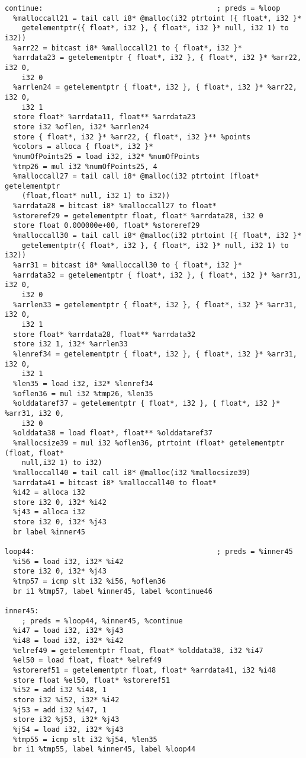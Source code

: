 \documentclass[main.tex]{subfiles}
\begin{document}
{\begin{lstlisting}
continue:                                         ; preds = %loop
  %malloccall21 = tail call i8* @malloc(i32 ptrtoint ({ float*, i32 }* 
    getelementptr({ float*, i32 }, { float*, i32 }* null, i32 1) to i32))
  %arr22 = bitcast i8* %malloccall21 to { float*, i32 }*
  %arrdata23 = getelementptr { float*, i32 }, { float*, i32 }* %arr22, i32 0,
    i32 0
  %arrlen24 = getelementptr { float*, i32 }, { float*, i32 }* %arr22, i32 0, 
    i32 1
  store float* %arrdata11, float** %arrdata23
  store i32 %oflen, i32* %arrlen24
  store { float*, i32 }* %arr22, { float*, i32 }** %points
  %colors = alloca { float*, i32 }*
  %numOfPoints25 = load i32, i32* %numOfPoints
  %tmp26 = mul i32 %numOfPoints25, 4
  %malloccall27 = tail call i8* @malloc(i32 ptrtoint (float* getelementptr 
    (float,float* null, i32 1) to i32))
  %arrdata28 = bitcast i8* %malloccall27 to float*
  %storeref29 = getelementptr float, float* %arrdata28, i32 0
  store float 0.000000e+00, float* %storeref29
  %malloccall30 = tail call i8* @malloc(i32 ptrtoint ({ float*, i32 }* 
    getelementptr({ float*, i32 }, { float*, i32 }* null, i32 1) to i32))
  %arr31 = bitcast i8* %malloccall30 to { float*, i32 }*
  %arrdata32 = getelementptr { float*, i32 }, { float*, i32 }* %arr31, i32 0,
    i32 0
  %arrlen33 = getelementptr { float*, i32 }, { float*, i32 }* %arr31, i32 0, 
    i32 1
  store float* %arrdata28, float** %arrdata32
  store i32 1, i32* %arrlen33
  %lenref34 = getelementptr { float*, i32 }, { float*, i32 }* %arr31, i32 0, 
    i32 1
  %len35 = load i32, i32* %lenref34
  %oflen36 = mul i32 %tmp26, %len35
  %olddataref37 = getelementptr { float*, i32 }, { float*, i32 }* %arr31, i32 0,
    i32 0
  %olddata38 = load float*, float** %olddataref37
  %mallocsize39 = mul i32 %oflen36, ptrtoint (float* getelementptr (float, float*
    null,i32 1) to i32)
  %malloccall40 = tail call i8* @malloc(i32 %mallocsize39)
  %arrdata41 = bitcast i8* %malloccall40 to float*
  %i42 = alloca i32
  store i32 0, i32* %i42
  %j43 = alloca i32
  store i32 0, i32* %j43
  br label %inner45

loop44:                                           ; preds = %inner45
  %i56 = load i32, i32* %i42
  store i32 0, i32* %j43
  %tmp57 = icmp slt i32 %i56, %oflen36
  br i1 %tmp57, label %inner45, label %continue46

inner45:                                          
    ; preds = %loop44, %inner45, %continue
  %i47 = load i32, i32* %j43
  %i48 = load i32, i32* %i42
  %elref49 = getelementptr float, float* %olddata38, i32 %i47
  %el50 = load float, float* %elref49
  %storeref51 = getelementptr float, float* %arrdata41, i32 %i48
  store float %el50, float* %storeref51
  %i52 = add i32 %i48, 1
  store i32 %i52, i32* %i42
  %j53 = add i32 %i47, 1
  store i32 %j53, i32* %j43
  %j54 = load i32, i32* %j43
  %tmp55 = icmp slt i32 %j54, %len35
  br i1 %tmp55, label %inner45, label %loop44


\end{lstlisting}}
\end{document}
